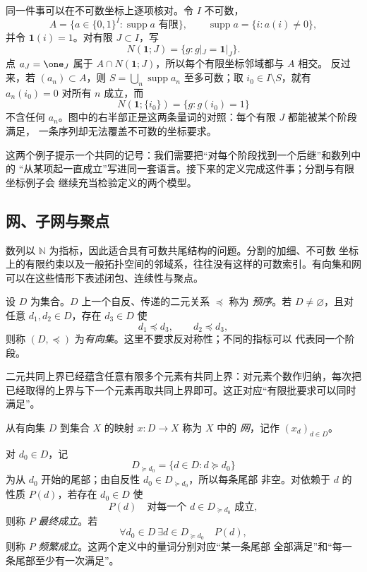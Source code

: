 同一件事可以在不可数坐标上逐项核对。令 $I$ 不可数，
\[
 A=\{a\in\{0,1\}^{I}:\operatorname{supp}a\text{ 有限}\},
 \qquad \operatorname{supp}a=\{i:a(i)\ne0\},
\]
并令 $\mathbf1(i)=1$。对有限 $J\subset I$，写
\[
 N(\mathbf1;J)=\{g:g|_J=\mathbf1|_J\}.
\]
点 $a_J=\one_J$ 属于 $A\cap N(\mathbf1;J)$，所以每个有限坐标邻域都与 $A$ 相交。
反过来，若 $(a_n)\subset A$，则
$S=\bigcup_n\operatorname{supp}a_n$ 至多可数；取 $i_0\in I\setminus S$，就有
$a_n(i_0)=0$ 对所有 $n$ 成立，而
\[
 N(\mathbf1;\{i_0\})=\{g:g(i_0)=1\}
\]
不含任何 $a_n$。图中的右半部正是这两条量词的对照：每个有限 $J$ 都能被某个阶段满足，
一条序列却无法覆盖不可数的坐标要求。

这两个例子提示一个共同的记号：我们需要把“对每个阶段找到一个后继”和数列中的
“从某项起一直成立”写进同一套语言。接下来的定义完成这件事；分割与有限坐标例子会
继续充当检验定义的两个模型。

\subsection{网、子网与聚点}
\label{ch1:subsec:nets}

数列以 $\mathbb N$ 为指标，因此适合具有可数共尾结构的问题。分割的加细、不可数
坐标上的有限约束以及一般拓扑空间的邻域系，往往没有这样的可数索引。有向集和网
可以在这些情形下表述闭包、连续性与聚点。

\begin{definition}[有向集]
设 \(D\) 为集合。\(D\) 上一个自反、传递的二元关系 \(\preceq\) 称为
\emph{预序}。若 \(D\neq\varnothing\)，且对任意 \(d_1,d_2\in D\)，存在
\(d_3\in D\) 使
\[
 d_1\preceq d_3,\qquad d_2\preceq d_3,
\]
则称 \((D,\preceq)\) 为\emph{有向集}。这里不要求反对称性；不同的指标可以
代表同一个阶段。
\end{definition}

二元共同上界已经蕴含任意有限多个元素有共同上界：对元素个数作归纳，每次把
已经取得的上界与下一个元素再取共同上界即可。这正对应“有限批要求可以同时满足”。

\begin{definition}[网、最终成立与频繁成立]
从有向集 \(D\) 到集合 \(X\) 的映射 \(x\colon D\to X\) 称为 \(X\) 中的
\emph{网}，记作 \((x_d)_{d\in D}\)。

对 \(d_0\in D\)，记
\[
 D_{\succeq d_0}=\{d\in D:d\succeq d_0\}
\]
为从 \(d_0\) 开始的尾部；由自反性 \(d_0\in D_{\succeq d_0}\)，所以每条尾部
非空。对依赖于 \(d\) 的性质 \(P(d)\)，若存在
\(d_0\in D\) 使
\[
 P(d)\quad\text{对每一个 }d\in D_{\succeq d_0}\text{ 成立},
\]
则称 \(P\) \emph{最终成立}。若
\[
 \forall d_0\in D\ \exists d\in D_{\succeq d_0}\quad P(d),
\]
则称 \(P\) \emph{频繁成立}。这两个定义中的量词分别对应“某一条尾部
全部满足”和“每一条尾部至少有一次满足”。
\end{definition}

